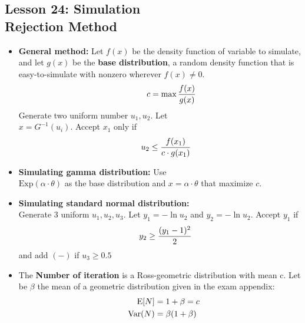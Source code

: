 \documentclass[10pt, french]{article}
\begin{document}
\begin{multicols*}{3}
\section*{Lesson 24: Simulation \\ Rejection Method}
\begin{itemize}[align=left,leftmargin=*]
    \item \textbf{General method:} Let $f(x)$ be the density function of variable to simulate, and let $g(x)$ be the \textbf{base distribution}, a random density function that is easy-to-simulate with nonzero wherever $f(x)\neq 0$. \[\hspace*{1cm} c = \max \frac{f(x)}{g(x)} \]
     Generate two uniform number $u_1, u_2$. Let \\ $x = G^{-1}(u_i)$. Accept $x_1$ only if \[\hspace*{.5cm} u_2 \leq \frac{f(x_1)}{c \cdot g(x_1)} \]
    \item \textbf{Simulating gamma distribution:} Use \\ $\mathrm{Exp}(\alpha \cdot \theta)$ as the base distribution and $x = \alpha \cdot \theta$ that maximize $c$.
    \item \textbf{Simulating standard normal distribution:} \\ Generate 3 uniform $u_1, u_2, u_3$. Let $y_1 = -\ln u_2$ and $y_2 = -\ln u_2$. Accept $y_1$ if \[\hspace*{.5cm} y_2 \geq \frac{(y_1-1)^2}{2} \] and add $(-)$ if $u_3 \geq 0.5$
    \item  The \textbf{Number of iteration} is a Ross-geometric distribution with mean c. Let be $\beta$ the mean of a geometric distribution given in the exam appendix:
    \begin{align*}
    \hspace*{.7cm}
        \mathrm{E} {\left[ N \right]} &= 1 + \beta = c \\
        \mathrm{Var} {\left( N \right)} &= \beta(1+\beta)
    \end{align*}
\end{itemize}

\def\SectionColor{red!80!white}

\end{multicols*}
\end{document}
